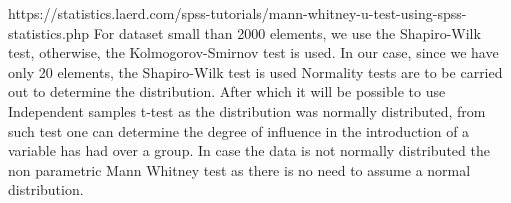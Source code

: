 https://statistics.laerd.com/spss-tutorials/mann-whitney-u-test-using-spss-statistics.php
For dataset small than 2000 elements, we use the Shapiro-Wilk test, otherwise, the Kolmogorov-Smirnov test is used. In our case, since we have only 20 elements, the Shapiro-Wilk test is used
Normality tests are to be carried out to determine the distribution. After which it will be possible to use Independent samples t-test\cite{siegel1956nonparametric} as 
the distribution was normally distributed, from such test one can determine the degree of influence in the introduction of a variable has had over a group. In case the data is not normally distributed the non parametric Mann Whitney test as there is no need to assume a normal distribution.